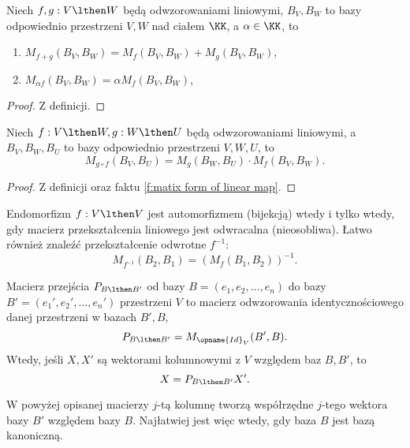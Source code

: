 \begin{theorem}
    Niech $f, g : V \lthen W$ będą odwzorowaniami liniowymi, $B_V, B_W$ to bazy odpowiednio przestrzeni $V, W$ nad ciałem $\KK$, a $\alpha \in \KK$, to
    \begin{enumerate}
        \item $M_{f+g}(B_V, B_W) = M_f(B_V, B_W) + M_g(B_V, B_W)$,
        \item $M_{\alpha f}(B_V, B_W) = \alpha M_f(B_V, B_W)$,
    \end{enumerate}
\end{theorem}
\begin{proof}
    Z definicji.
\end{proof}

\begin{theorem}
    Niech $f : V \lthen W, g : W \lthen U$ będą odwzorowaniami liniowymi, a $B_V, B_W, B_U$ to bazy odpowiednio przestrzeni $V, W, U$, to
    \[ M_{g\circ f}(B_V, B_U) = M_g(B_W, B_U) \cdot M_f(B_V, B_W). \]
\end{theorem}
\begin{proof}
    Z definicji oraz faktu \ref{f:matix form of linear map}.
\end{proof}

\begin{corollary}
    Endomorfizm $f : V \lthen V$ jest automorfizmem (bijekcją) wtedy i tylko wtedy, gdy macierz przekształcenia liniowego jest odwracalna (nieosobliwa). Łatwo również znaleźć przekształcenie odwrotne $f^{-1}$:
    \[ M_{f^{-1}}(B_2, B_1) = (M_f(B_1, B_2))^{-1}. \]
\end{corollary}

\begin{definition}
    Macierz przejścia $P_{B \lthen B'}$ od bazy $B = (e_1, e_2, \ldots, e_n)$ do bazy $B' = (e_1', e_2', \ldots, e_n')$ przestrzeni $V$ to macierz odwzorowania identycznościowego danej przestrzeni w bazach $B', B$,
    \[ P_{B\lthen B'} = M_{\opname{Id}_V}(B', B). \]
    Wtedy, jeśli $X, X'$ są wektorami kolumnowymi z $V$ względem baz $B, B'$, to
    \[ X = P_{B \lthen B'}X'. \]
\end{definition}

\begin{remark*}
    W powyżej opisanej macierzy $j$-tą kolumnę tworzą współrzędne $j$-tego wektora bazy $B'$ względem bazy $B$. Najłatwiej jest więc wtedy, gdy baza $B$ jest bazą kanoniczną.
\end{remark*}

